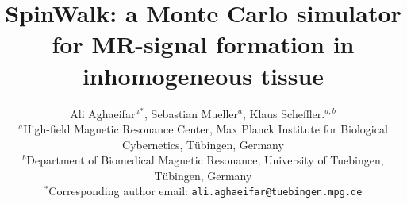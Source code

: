 
\title{SpinWalk: a Monte Carlo simulator for MR-signal formation in inhomogeneous tissue}

\author{Ali Aghaeifar$^{a}$$^{*}$, Sebastian Mueller$^{a}$, Klaus Scheffler.$^{a, b}$ \\
        \small $^{a}$High-field Magnetic Resonance Center, Max Planck Institute for Biological Cybernetics, Tübingen, Germany \\
        \small $^{b}$Department of Biomedical Magnetic Resonance, University of Tuebingen, Tübingen, Germany  \\
        \small $^{*}$Corresponding author email: \tt{ali.aghaeifar@tuebingen.mpg.de} \\
}
\date{}


